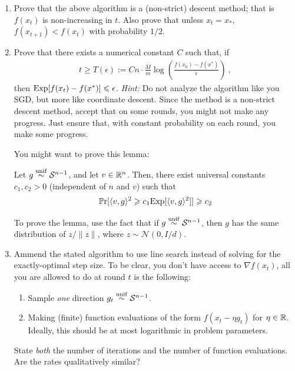 \documentclass[12pt]{article}
\begin{document}
\begin{enumerate}
	\item Prove that the above algorithm is a (non-strict) descent method; that is $f(x_t)$ is non-increasing in $t$. Also prove that unless $x_t = x_*$, $f(x_{t+1}) < f(x_t)$ with probability $1/2$. 
	\item Prove that there exists a numerical constant $C$ such that, if 
	\begin{eqnarray}
	t \ge T(\epsilon) := C n \cdot \frac{M}{m} \log (\frac{f(x_0) - f(x^*)}{\epsilon})~,
	\end{eqnarray}
	then $\mathrm{Exp}[f(x_t) - f(x^*)] \leqslant \epsilon$. \emph{Hint:} Do not analyze the algorithm like you SGD, but more like coordinate descent. Since the method is a non-strict descent method, accept that on some rounds, you might not make any progress. Just ensure that, with constant probability on each round, you make some progress. 


	You might want to prove this lemma:
	\begin{lemma}Let $g \overset{\mathrm{unif}}{\sim} {\cal S}^{n-1}$, and let $v \in \mathbb{R}^n$. Then, there exist universal constants $c_1,c_2 > 0$ (independent of $n$ and $v$) such that 
	\begin{eqnarray}
	\operatorname*{\mathbb{P} r}[\langle v, g \rangle^2 \geqslant c_1\mathrm{Exp}[\langle v, g \rangle^2]] \geqslant c_2
	\end{eqnarray}
	\end{lemma}
	To prove the lemma, use the fact that if $g \overset{\mathrm{unif}}{\sim} {\cal S}^{n-1}$, then $g$ has the same distribution of $z/\|z\|$, where $z \sim \mathcal{N}(0,I/d)$. 


	\item Ammend the stated algorithm to use line search instead of solving for the exactly-optimal step size. To be clear, you don't have access to $\nabla f(x_t)$, all you are allowed to do at round $t$ is the following:
	\begin{enumerate}
		\item Sample \emph{one} direction $g_t \overset{\mathrm{unif}}{\sim} {\cal S}^{n-1}$.
		\item Making (finite) function evaluations of the form $f(x_t - \eta g_t)$ for $\eta \in \mathbb{R}$. Ideally, this should be at most logarithmic in problem parameters.
	\end{enumerate}
	State \emph{both} the number of iterations and the number of function evaluations. Are the rates qualitatively similar? 
\end{enumerate}
\end{document}
